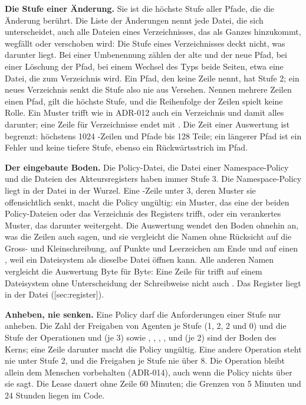 {\bf Die Stufe einer Änderung.}
Sie ist die höchste Stufe aller Pfade, die die Änderung berührt.
Die Liste der Änderungen nennt jede Datei, die sich unterscheidet, auch alle Dateien eines
Verzeichnisses, das als Ganzes hinzukommt, wegfällt oder verschoben wird:
Die Stufe eines Verzeichnisses deckt nicht, was darunter liegt.
Bei einer Umbenennung zählen der alte und der neue Pfad,
bei einer Löschung der Pfad, bei einem Wechsel des Typs beide Seiten,
etwa eine Datei, die zum Verzeichnis wird.
Ein Pfad, den keine Zeile nennt, hat Stufe 2; ein neues Verzeichnis senkt die Stufe also nie
aus Versehen.
Nennen mehrere Zeilen einen Pfad, gilt die höchste Stufe, und die Reihenfolge der Zeilen
spielt keine Rolle.
Ein Muster trifft wie in ADR-012 auch ein Verzeichnis und damit alles darunter;
eine Zeile für Verzeichnisse endet mit \type{/}.
Die Zeit einer Auswertung ist begrenzt:
höchstens 1024 -Zeilen und Pfade bis 128 Teile;
ein längerer Pfad ist ein Fehler und keine tiefere Stufe, ebenso ein Rückwärtsstrich im Pfad.

{\bf Der eingebaute Boden.}
Die Policy-Datei, die Datei einer Namespace-Policy und die Dateien des Akteursregisters haben
immer Stufe 3.
Die Namespace-Policy liegt in der Datei  in der Wurzel.
Eine -Zeile unter 3, deren Muster sie offensichtlich senkt, macht die Policy ungültig:
ein Muster, das eine der beiden Policy-Dateien oder das Verzeichnis des Registers trifft,
oder ein verankertes Muster, das darunter weitergeht.
Die Auswertung wendet den Boden ohnehin an, was die Zeilen auch sagen,
und sie vergleicht die Namen ohne Rücksicht auf die Gross- und Kleinschreibung,
auf Punkte und Leerzeichen am Ende und auf einen ,
weil ein Dateisystem  als dieselbe Datei öffnen kann.
Alle anderen Namen vergleicht die Auswertung Byte für Byte:
Eine Zeile für  trifft auf einem Dateisystem ohne Unterscheidung der Schreibweise
nicht auch .
Das Register liegt in der Datei  ([sec:register]).

{\bf Anheben, nie senken.}
Eine Policy darf die Anforderungen einer Stufe nur anheben.
Die Zahl der Freigaben von Agenten je Stufe (1, 2, 2 und 0) und die Stufe der Operationen
 und  (je 3) sowie , ,
, ,  und  (je 2) sind der Boden des Kerns;
eine Zeile darunter macht die Policy ungültig.
Eine andere Operation steht nie unter Stufe 2, und die Freigaben je Stufe nie über 8.
Die Operation  bleibt allein dem Menschen vorbehalten (ADR-014), auch wenn die Policy
nichts über sie sagt.
Die Lease dauert ohne Zeile 60 Minuten; die Grenzen von 5 Minuten und 24 Stunden liegen im Code.

